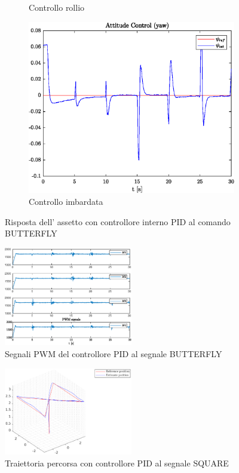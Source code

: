 \begin{figure}
\begin{subfigure}{0.45\textwidth}
		\caption{Controllo rollio}
	\end{subfigure}
	\hfill
	\begin{subfigure}{0.45\textwidth}
		\centering
		\includegraphics[width=1\textwidth]{Simulazioni/Figure/PID/BUTTERFLY/AttitudeControlYaw}
		\caption{Controllo imbardata}
	\end{subfigure}
	\caption{Risposta dell' assetto con controllore interno PID al comando BUTTERFLY}
\end{figure}


\begin{figure}
	\centering
	\includegraphics[width=0.5\textwidth]{Simulazioni/Figure/PID/BUTTERFLY/PWM}
	\caption{Segnali PWM del controllore PID al segnale BUTTERFLY}
\end{figure}
\begin{figure}
	\centering
	\includegraphics[width=0.5\textwidth]{Simulazioni/Figure/PID/BUTTERFLY/Trajectory}
	\caption{Traiettoria percorsa con controllore PID al segnale SQUARE}
\end{figure}

